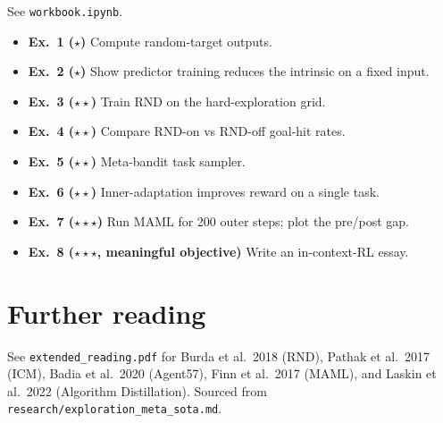 \documentclass[11pt,oneside]{scrbook}
\begin{document}
See \texttt{workbook.ipynb}.
\begin{itemize}
  \item \textbf{Ex.\ 1 ($\star$)} Compute random-target outputs.
  \item \textbf{Ex.\ 2 ($\star$)} Show predictor training reduces the intrinsic on a fixed input.
  \item \textbf{Ex.\ 3 ($\star\star$)} Train RND on the hard-exploration grid.
  \item \textbf{Ex.\ 4 ($\star\star$)} Compare RND-on vs RND-off goal-hit rates.
  \item \textbf{Ex.\ 5 ($\star\star$)} Meta-bandit task sampler.
  \item \textbf{Ex.\ 6 ($\star\star$)} Inner-adaptation improves reward on a single task.
  \item \textbf{Ex.\ 7 ($\star\star\star$)} Run MAML for 200 outer steps; plot the pre/post gap.
  \item \textbf{Ex.\ 8 ($\star\star\star$, meaningful objective)} Write an in-context-RL essay.
\end{itemize}

\chapter{Further reading}

See \texttt{extended\_reading.pdf} for Burda et al.\ 2018 (RND), Pathak et al.\ 2017 (ICM), Badia et al.\ 2020 (Agent57), Finn et al.\ 2017 (MAML), and Laskin et al.\ 2022 (Algorithm Distillation). Sourced from \texttt{research/exploration\_meta\_sota.md}.
\end{document}
